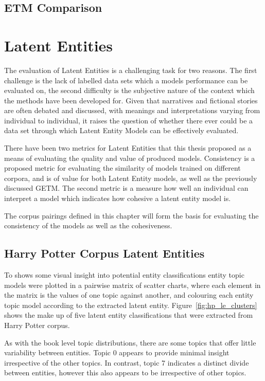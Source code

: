 \documentclass[10pt]{report}
\begin{document}
\clearpage
\subsection{ETM Comparison}

\clearpage
\section{Latent Entities}
The evaluation of Latent Entities is a challenging task for two reasons. The first challenge is the lack of labelled data sets which a models performance can be evaluated on, the second difficulty is the subjective nature of the context which the methods have been developed for. Given that narratives and fictional stories are often debated and discussed, with meanings and interpretations varying from individual to individual, it raises the question of whether there ever could be a data set through which Latent Entity Models can be effectively evaluated.

There have been two metrics for Latent Entities that this thesis proposed as a means of evaluating the quality and value of produced models. Consistency is a proposed metric for evaluating the similarity of models trained on different corpora, and is of value for both Latent Entity models, as well as the previously discussed GETM. The second metric is a measure how well an individual can interpret a model which indicates how cohesive a latent entity model is.

The corpus pairings defined in this chapter will form the basis for evaluating the consistency of the models as well as the cohesiveness. 

\clearpage
\subsection{Harry Potter Corpus Latent Entities}
To shows some visual insight into potential entity classifications entity topic models were plotted in a pairwise matrix of scatter charts, where each element in the matrix is the values of one topic against another, and colouring each entity topic model according to the extracted latent entity. Figure~\ref{fig:hp_le_clusters} shows the make up of five latent entity classifications that were extracted from Harry Potter corpus.

As with the book level topic distributions, there are some topics that offer little variability between entities. Topic 0 appears to provide minimal insight irrespective of the other topics. In contrast, topic 7 indicates a distinct divide between entities, however this also appears to be irrespective of other topics.
\end{document}
